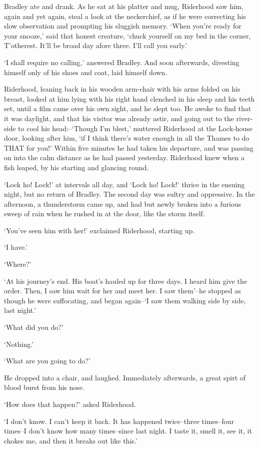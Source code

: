 Bradley ate and drank. As he sat at his platter and mug, Riderhood saw
him, again and yet again, steal a look at the neckerchief, as if he were
correcting his slow observation and prompting his sluggish memory.
‘When you’re ready for your snooze,’ said that honest creature, ‘chuck
yourself on my bed in the corner, T’otherest. It’ll be broad day afore
three. I’ll call you early.’

‘I shall require no calling,’ answered Bradley. And soon afterwards,
divesting himself only of his shoes and coat, laid himself down.

Riderhood, leaning back in his wooden arm-chair with his arms folded
on his breast, looked at him lying with his right hand clenched in his
sleep and his teeth set, until a film came over his own sight, and he
slept too. He awoke to find that it was daylight, and that his
visitor was already astir, and going out to the river-side to cool his
head:--‘Though I’m blest,’ muttered Riderhood at the Lock-house door,
looking after him, ‘if I think there’s water enough in all the Thames
to do THAT for you!’ Within five minutes he had taken his departure,
and was passing on into the calm distance as he had passed yesterday.
Riderhood knew when a fish leaped, by his starting and glancing round.

‘Lock ho! Lock!’ at intervals all day, and ‘Lock ho! Lock!’ thrice in
the ensuing night, but no return of Bradley. The second day was sultry
and oppressive. In the afternoon, a thunderstorm came up, and had but
newly broken into a furious sweep of rain when he rushed in at the door,
like the storm itself.

‘You’ve seen him with her!’ exclaimed Riderhood, starting up.

‘I have.’

‘Where?’

‘At his journey’s end. His boat’s hauled up for three days. I heard
him give the order. Then, I saw him wait for her and meet her. I saw
them’--he stopped as though he were suffocating, and began again--‘I saw
them walking side by side, last night.’

‘What did you do?’

‘Nothing.’

‘What are you going to do?’

He dropped into a chair, and laughed. Immediately afterwards, a great
spirt of blood burst from his nose.

‘How does that happen?’ asked Riderhood.

‘I don’t know. I can’t keep it back. It has happened twice--three
times--four times--I don’t know how many times--since last night. I
taste it, smell it, see it, it chokes me, and then it breaks out like
this.’

